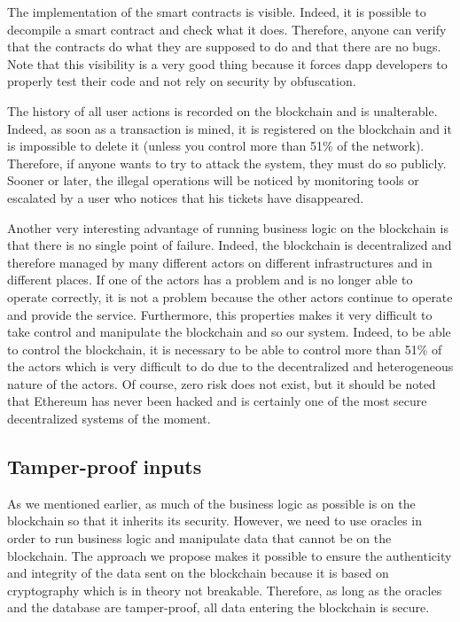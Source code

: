 \documentclass[a4paper,11pt,oneside]{report}
\begin{document}
The implementation of the smart contracts is visible. Indeed, it is possible to decompile a smart contract and check what it does. Therefore, anyone can verify that the contracts do what they are supposed to do and that there are no bugs. Note that this visibility is a very good thing because it forces dapp developers to properly test their code and not rely on security by obfuscation.

The history of all user actions is recorded on the blockchain and is unalterable. Indeed, as soon as a transaction is mined, it is registered on the blockchain and it is impossible to delete it (unless you control more than 51\% of the network). Therefore, if anyone wants to try to attack the system, they must do so publicly. Sooner or later, the illegal operations will be noticed by monitoring tools or escalated by a user who notices that his tickets have disappeared. 

Another very interesting advantage of running business logic on the blockchain is that there is no single point of failure. Indeed, the blockchain is decentralized and therefore managed by many different actors on different infrastructures and in different places. If one of the actors has a problem and is no longer able to operate correctly, it is not a problem because the other actors continue to operate and provide the service. Furthermore, this properties makes it very difficult to take control and manipulate the blockchain and so our system. Indeed, to be able to control the blockchain, it is necessary to be able to control more than 51\% of the actors which is very difficult to do due to the decentralized and heterogeneous nature of the actors. Of course, zero risk does not exist, but it should be noted that Ethereum has never been hacked and is certainly one of the most secure decentralized systems of the moment.

\subsection{Tamper-proof inputs}
As we mentioned earlier, as much of the business logic as possible is on the blockchain so that it inherits its security. However, we need to use oracles in order to run business logic and manipulate data that cannot be on the blockchain. The approach we propose makes it possible to ensure the authenticity and integrity of the data sent on the blockchain because it is based on cryptography which is in theory not breakable. Therefore, as long as the oracles and the database are tamper-proof, all data entering the blockchain is secure.
\end{document}
